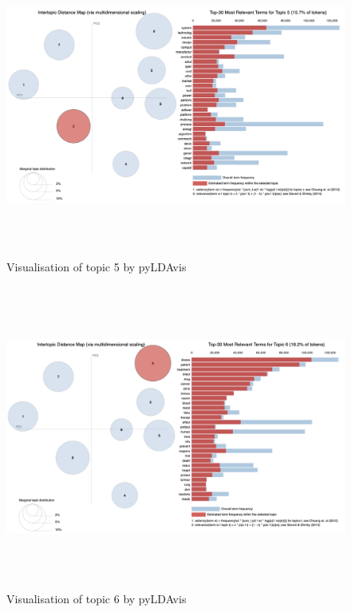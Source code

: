 \begin{figure}[H]
    \centering
    \includegraphics[width = 16cm, height = 10cm]{./img/pylda_topic5.png}
    \caption{Visualisation of topic 5 by pyLDAvis}
\end{figure}


\begin{figure}[H]
    \centering
    \includegraphics[width = 16cm, height = 10cm]{./img/pylda_topic6.png}
    \caption{Visualisation of topic 6 by pyLDAvis}
\end{figure}

